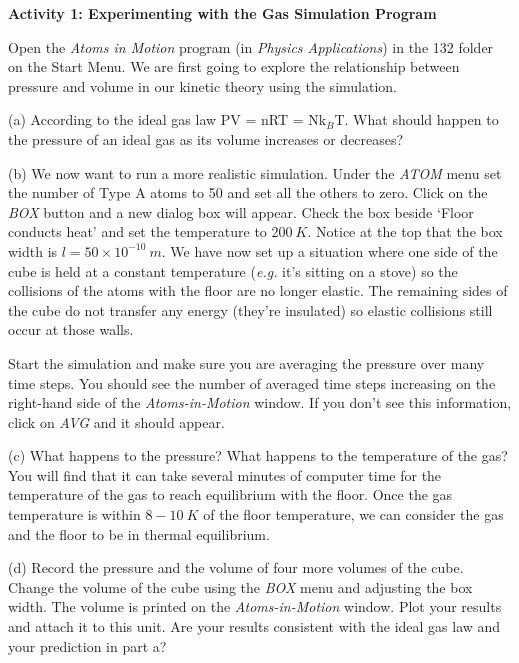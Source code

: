 \textbf{Activity 1: Experimenting with the Gas Simulation Program}

Open the {\it Atoms in Motion} program (in {\it Physics Applications}) in the 132 folder on the Start Menu.
We are first going to explore the relationship between pressure and volume in
our kinetic theory using the simulation. 

(a) According to the ideal gas law PV = nRT = Nk\( _{B} \)T. What
should happen to the pressure of an ideal gas as its volume increases
or decreases?
\vspace{1.0in}

(b) We now want to run a more realistic simulation.
Under the {\it ATOM} menu set the number of Type A atoms to 50 and set all the others to zero.
Click on the {\it BOX} button and a new dialog box will appear.
Check the box beside `Floor conducts heat' and set the temperature to $200~K$.
Notice at the top that the box width is $l=50 \times 10^{-10}~m$.
We have now set up a situation where one side of the cube is held at a constant
temperature ({\it e.g.} it's sitting on a stove) so the collisions of the atoms with the
floor are no longer elastic.
The remaining sides of the
cube do not transfer any energy (they're insulated) so elastic collisions still occur 
at those walls.

Start
the simulation and make sure you are averaging the pressure over many time steps.
You should see the number of averaged time steps increasing on the right-hand side 
of the {\it Atoms-in-Motion} window. 
If you don't see this information, click on {\it AVG} and it should appear.

\newpage

(c) What happens to the pressure?
What happens to the temperature of the gas? 
You will find that it can take several minutes of computer time for the temperature of the
gas to reach equilibrium with the floor.
Once the gas temperature is within $8-10~K$ of the floor temperature, we can consider the
gas and the floor to be in thermal equilibrium.
\vspace{20mm}

(d) Record the pressure
and the volume of four more volumes of the cube. Change the volume of the cube using the
{\it BOX} menu and adjusting the box width. The volume is printed on the
{\it Atoms-in-Motion} window.
Plot your results and attach it
to this unit. Are your results consistent with the ideal gas law and
your prediction in part a?

